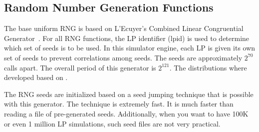 \documentclass[12pt]{article}
\begin{document}





\subsection{Random Number Generation Functions}
The base uniform RNG is based on L'Ecuyer's Combined Linear
Congruential Generator~\cite{lecuyer-mcs-97}.  For all RNG functions,
the LP identifier (lpid) is used to determine which set of seeds is to
be used. In this simulator engine, each LP is given its own set of
seeds to prevent correlations among seeds. The seeds are approximately
$2^{70}$ calls apart. The overall period of this generator is
$2^{121}$. The distributions where developed based on
\cite{jain-1991}.

The RNG seeds are initialized based on a seed jumping technique that
is possible with this generator. The technique is extremely fast. It
is much faster than reading a file of pre-generated
seeds. Additionally, when you want to have 100K or even 1 million LP
simulations, such seed files are not very practical.
\end{document}
